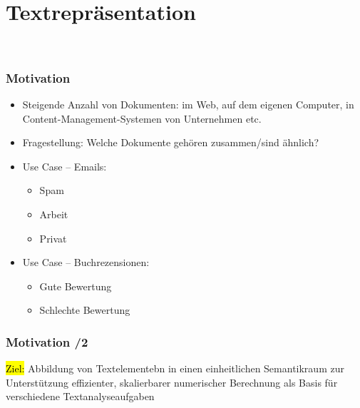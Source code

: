 
\section{Textrepräsentation}

\
\begin{frame}
    \frametitle{Motivation}

    \begin{itemize}
    \item Steigende Anzahl von Dokumenten: im Web, auf dem eigenen Computer, in Content-Management-Systemen von Unternehmen etc.
    \item Fragestellung: Welche Dokumente gehören zusammen/sind ähnlich?
    \item Use Case -- Emails:
    \begin{itemize}
    \item Spam
    \item Arbeit
    \item Privat
    \end{itemize}
    \item Use Case -- Buchrezensionen:
    \begin{itemize}
    \item Gute Bewertung
    \item Schlechte Bewertung
    \end{itemize}
    \end{itemize}
\end{frame}


\begin{frame}
    \frametitle{Motivation /2}

\hl{Ziel:} Abbildung von Textelementebn in einen einheitlichen Semantikraum zur Unterstützung effizienter, skalierbarer numerischer Berechnung
als Basis für verschiedene Textanalyseaufgaben

\end{frame}

    
